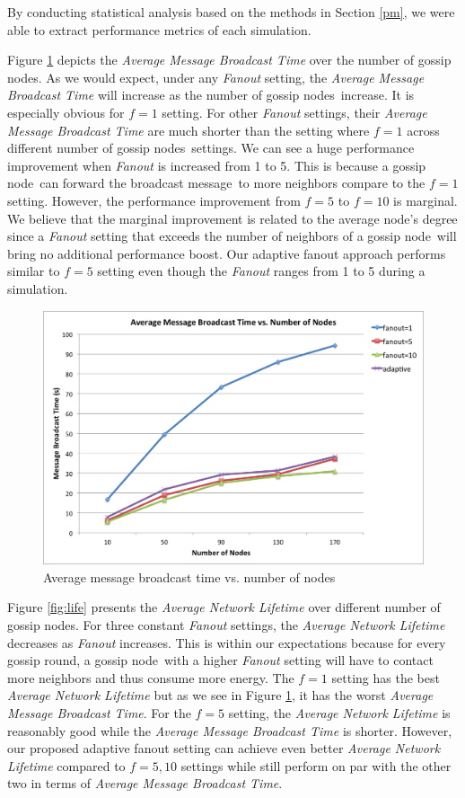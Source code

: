 \documentclass[onehalf,11pt]{beavtex}
\newcommand{\msg}{message}
\newcommand{\gn}{gossip node}
\newcommand{\gns}{gossip nodes}
\newcommand{\ambt}{Average Message Broadcast Time}
\newcommand{\anl}{Average Network Lifetime}
\begin{document}
By conducting statistical analysis based on the methods in Section \ref{pm}, we were able to extract performance metrics of each simulation. 

Figure \ref{fig:brTime} depicts the \emph{Average Message Broadcast Time} over the number of \gns. As we would expect, under any \emph{Fanout} setting, the \emph{\ambt} will increase as the number of \gns ~increase. It is especially obvious for $f=1$ setting. For other \emph{Fanout} settings, their \emph{\ambt} are much shorter than the setting where $f=1$ across different number of \gns ~settings. We can see a huge performance improvement when \emph{Fanout} is increased from 1 to 5. This is because a \gn ~can forward the broadcast \msg ~to more neighbors compare to the $f=1$ setting. However, the performance improvement from $f=5$ to $f=10$ is marginal. We believe that the marginal improvement is related to the average node's degree since a \emph{Fanout} setting that exceeds the number of neighbors of a \gn ~will bring no additional performance boost. Our adaptive fanout approach performs similar to $f=5$ setting even though the \emph{Fanout} ranges from 1 to 5 during a simulation. 

\begin{figure} 
	\centering
	\includegraphics[width=5.5in]{brTime.png}
	\caption{Average message broadcast time vs. number of nodes}
	\label{fig:brTime}
\end{figure}

Figure \ref{fig:life} presents the \emph{Average Network Lifetime} over different number of \gns. For three constant \emph{Fanout} settings, the \emph{\anl} decreases as \emph{Fanout} increases. This is within our expectations because for every gossip round, a \gn ~with a higher \emph{Fanout} setting will have to contact more neighbors and thus consume more energy. The $f=1$ setting has the best \emph{\anl} but as we see in Figure \ref{fig:brTime}, it has the worst \emph{\ambt}. For the $f=5$ setting, the \emph{\anl} is reasonably good while the \emph{\ambt} is shorter. However, our proposed adaptive fanout setting can achieve even better \emph{\anl} compared to $f=5,10$ settings while still perform on par with the other two in terms of \emph{\ambt}. 
\end{document}
